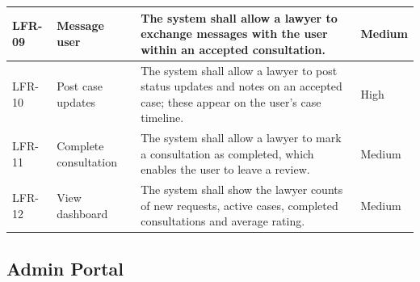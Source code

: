 \begin{longtable}{|L{1.66cm}|L{2.35cm}|L{8.30cm}|L{1.70cm}|}
LFR-09 & Message user & The system shall allow a lawyer to exchange messages with the user within an accepted consultation. & Medium \\ \hline
LFR-10 & Post case updates & The system shall allow a lawyer to post status updates and notes on an accepted case; these appear on the user's case timeline. & High \\ \hline
LFR-11 & Complete consultation & The system shall allow a lawyer to mark a consultation as completed, which enables the user to leave a review. & Medium \\ \hline
LFR-12 & View dashboard & The system shall show the lawyer counts of new requests, active cases, completed consultations and average rating. & Medium \\
\end{longtable}

\subsection{Admin Portal}

